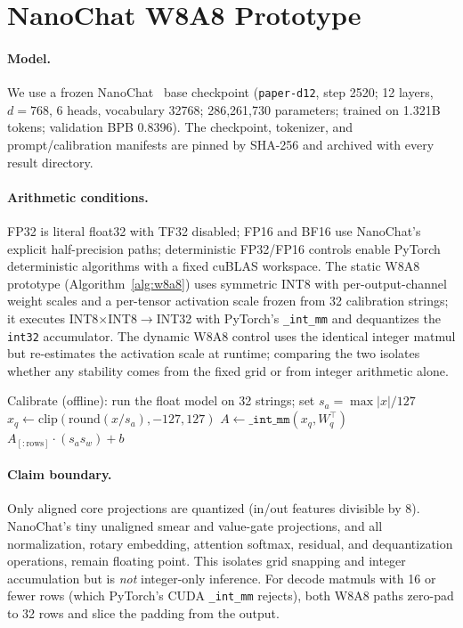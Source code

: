 \documentclass[wcp]{jmlr}
\begin{document}
\section{NanoChat W8A8 Prototype}
\paragraph{Model.} We use a frozen NanoChat~\citep{karpathy2025nanochat} base
checkpoint (\texttt{paper-d12}, step 2520; 12 layers, $d{=}768$, 6 heads, vocabulary
32768; 286{,}261{,}730 parameters; trained on 1.321B tokens; validation BPB 0.8396).
The checkpoint, tokenizer, and prompt/calibration manifests are pinned by SHA-256
and archived with every result directory.

\paragraph{Arithmetic conditions.} FP32 is literal float32 with TF32 disabled; FP16
and BF16 use NanoChat's explicit half-precision paths; deterministic FP32/FP16
controls enable PyTorch deterministic algorithms with a fixed cuBLAS workspace. The
static W8A8 prototype (Algorithm~\ref{alg:w8a8}) uses symmetric INT8 with
per-output-channel weight scales and a per-tensor activation scale frozen from 32
calibration strings; it executes INT8$\times$INT8$\to$INT32 with PyTorch's
\texttt{\_int\_mm} and dequantizes the \texttt{int32} accumulator. The dynamic W8A8
control uses the identical integer matmul but re-estimates the activation scale at
runtime; comparing the two isolates whether any stability comes from the fixed grid
or from integer arithmetic alone.

\begin{algorithm}[t]
\caption{Static W8A8 linear (per-channel weights, per-tensor frozen activation).}
\label{alg:w8a8}
Calibrate (offline): run the float model on 32 strings; set $s_a = \max|x|/127$\;
$x_q \gets \mathrm{clip}(\mathrm{round}(x / s_a), -127, 127)$ 
$A \gets \texttt{\_int\_mm}(x_q, W_q^\top)$ 
\Return $A_{[:\mathrm{rows}]} \cdot (s_a s_w) + b$ 
\end{algorithm}

\paragraph{Claim boundary.} Only aligned core projections are quantized (in/out
features divisible by 8). NanoChat's tiny unaligned smear and value-gate
projections, and all normalization, rotary embedding, attention softmax, residual,
and dequantization operations, remain floating point. This isolates grid snapping
and integer accumulation but is \emph{not} integer-only inference. For decode
matmuls with 16 or fewer rows (which PyTorch's CUDA \texttt{\_int\_mm} rejects), both
W8A8 paths zero-pad to 32 rows and slice the padding from the output.
\end{document}

